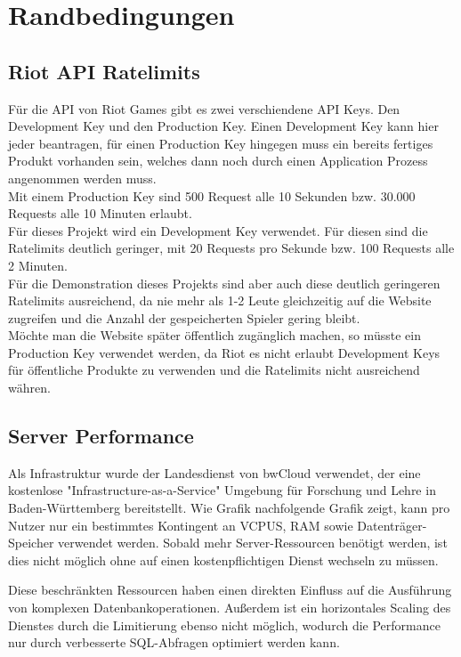 \section{Randbedingungen}

\subsection{Riot API Ratelimits}\label{riot-api-ratelimits}
Für die API von Riot Games gibt es zwei verschiendene API Keys. Den Development Key und den Production Key. Einen Development Key kann hier jeder beantragen, für einen Production Key hingegen muss ein bereits fertiges Produkt vorhanden sein, welches dann noch durch einen Application Prozess angenommen werden muss.\\
Mit einem Production Key sind 500 Request alle 10 Sekunden bzw. 30.000 Requests alle 10 Minuten erlaubt.\\
Für dieses Projekt wird ein Development Key verwendet. Für diesen sind die Ratelimits deutlich geringer, mit 20 Requests pro Sekunde bzw. 100 Requests alle 2 Minuten.\\
Für die Demonstration dieses Projekts sind aber auch diese deutlich geringeren Ratelimits ausreichend, da nie mehr als 1-2 Leute gleichzeitig auf die Website zugreifen und die Anzahl der gespeicherten Spieler gering bleibt.\\
Möchte man die Website später öffentlich zugänglich machen, so müsste ein Production Key verwendet werden, da Riot es nicht erlaubt Development Keys für öffentliche Produkte zu verwenden und die Ratelimits nicht ausreichend währen.

\subsection{Server Performance}

Als Infrastruktur wurde der Landesdienst von bwCloud verwendet, der eine kostenlose
"Infrastructure-as-a-Service" Umgebung für Forschung und Lehre in Baden-Württemberg bereitstellt.
Wie Grafik nachfolgende Grafik zeigt, kann pro Nutzer nur ein bestimmtes Kontingent an VCPUS, RAM sowie Datenträger-Speicher verwendet werden.
Sobald mehr Server-Ressourcen benötigt werden, ist dies nicht möglich ohne auf einen kostenpflichtigen Dienst wechseln zu müssen.


Diese beschränkten Ressourcen haben einen direkten Einfluss auf die Ausführung von komplexen Datenbankoperationen. Außerdem ist ein
horizontales Scaling des Dienstes durch die Limitierung ebenso nicht möglich, wodurch die Performance nur durch verbesserte SQL-Abfragen
optimiert werden kann.
